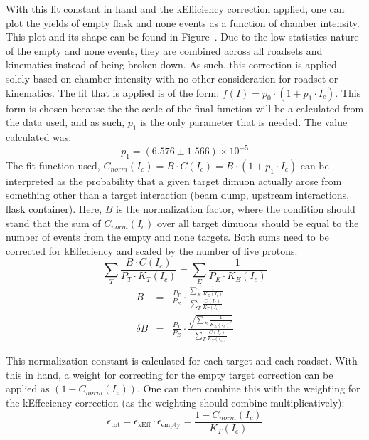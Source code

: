 With this fit constant in hand and the kEfficiency correction applied, one can plot the yields of empty flask and none events as a function of chamber intensity. This plot and its shape can be found in Figure~. Due to the low-statistics nature of the empty and none events, they are combined across all roadsets and kinematics instead of being broken down. As such, this correction is applied solely based on chamber intensity with no other consideration for roadset or kinematics. The fit that is applied is of the form: $f(I) = p_0 \cdot (1 + p_1 \cdot I_c)$. This form is chosen because the the scale of the final function will be a calculated from the data used, and as such, $p_1$ is the only parameter that is needed. The value calculated was:
\begin{equation}
p_1 = (6.576 \pm 1.566) \times 10^{-5}
\end{equation}
The fit function used, $C_{norm}(I_c) = B \cdot C(I_c) = B \cdot (1 + p_1 \cdot I_c)$  can be interpreted as the probability that a given target dimuon actually arose from something other than a target interaction (beam dump, upstream interactions, flask container). Here, $B$ is the normalization factor, where the condition should stand that the sum of $C_{norm}(I_c)$ over all target dimuons should be equal to the number of events from the empty and none targets. Both sums need to be corrected for kEffeciency and scaled by the number of live protons.
\begin{equation}
\sum\limits_T \frac{B \cdot C(I_c)}{P_T \cdot K_T(I_c)} = \sum\limits_E \frac{1}{P_E \cdot K_E(I_c)}
\end{equation}
\begin{eqnarray}
B & = & \frac{P_T}{P_E} \cdot \frac{\sum\limits_E \frac{1}{K_E(I_c)}}{\sum\limits_T \frac{C(I_c)}{K_T(I_c)}} \\
\delta B & = & \frac{P_T}{P_E} \cdot \frac{\sqrt{\sum\limits_E \frac{1}{K_E(I_c)^2}}}{\sum\limits_T \frac{C(I_c)}{K_T(I_c)}}
\end{eqnarray}

This normalization constant is calculated for each target and each roadset. With this in hand, a weight for correcting for the empty target correction can be applied as $(1 - C_{norm}(I_c))$. One can then combine this with the weighting for the kEffeciency correction (as the weighting should combine multiplicatively):
\begin{equation}
\epsilon_{\text{tot}} = \epsilon_{\text{kEff}} \cdot \epsilon_{\text{empty}} = \frac{1 - C_{norm}(I_c)}{K_T(I_c)}
\end{equation}

